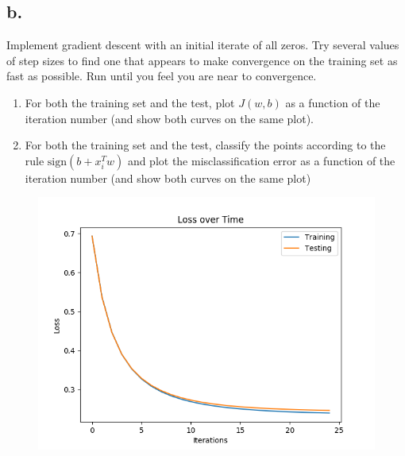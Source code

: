 \documentclass{article}
\newcommand{\1}{\mathbf{1}}
\begin{document}
{\subsection*{b.}

Implement gradient descent with an initial iterate of all zeros. Try several values of step sizes to find one that appears to make convergence on the training set as fast as possible. Run until you feel you are near to convergence.

\begin{enumerate}
  \item For both the training set and the test, plot $J(w,b)$ as a function of the iteration number (and show both curves on the same plot).
  \item For both the training set and the test, classify the points according to the rule $\text{sign}(b + x_i^T w)$ and plot the misclassification error as a function of the iteration number (and show both curves on the same plot)
\end{enumerate}

\begin{figure}[hb]
  \centering
  \includegraphics[width=150mm]{../hw2-code/results/a6_bi.png}
\end{figure}

}
\end{document}
